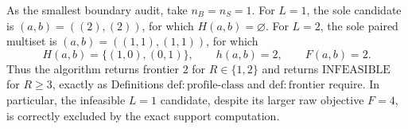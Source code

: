 As the smallest boundary audit, take \(n_B=n_S=1\).  For \(L=1\), the sole candidate is \((a,b)=((2),(2))\), for which \(H(a,b)=\varnothing\).  For \(L=2\), the sole paired multiset is \((a,b)=((1,1),(1,1))\), for which
\[
 H(a,b)=\{(1,0),(0,1)\},\qquad h(a,b)=2,\qquad F(a,b)=2.
\]
Thus the algorithm returns frontier \(2\) for \(R\in\{1,2\}\) and returns \(\mathrm{INFEASIBLE}\) for \(R\ge3\), exactly as Definitions \(\mathrm{def{:}profile\text{-}class}\) and \(\mathrm{def{:}frontier}\) require.  In particular, the infeasible \(L=1\) candidate, despite its larger raw objective \(F=4\), is correctly excluded by the exact support computation.
